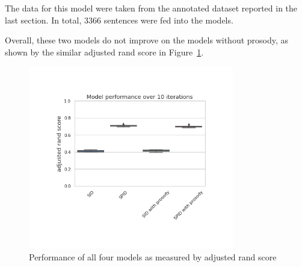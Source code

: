 The data for this model were taken from the annotated dataset reported in the last section. In total, $3366$  sentences were fed into the models.


Overall, these two models do not improve on the models without prosody, as shown by the similar adjusted rand score in Figure~\ref{fig:prosody:compare}.

\begin{figure}[H]
    \centering
    \includegraphics[width=0.8\textwidth]{figures/compare-adjusted-bu.jpg}
    \caption{Performance of all four models as measured by adjusted rand score }
    \label{fig:prosody:compare}
\end{figure}

